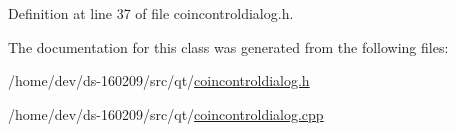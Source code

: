 Definition at line 37 of file coincontroldialog.\+h.



The documentation for this class was generated from the following files\+:\begin{DoxyCompactItemize}
\item 
/home/dev/ds-\/160209/src/qt/\hyperlink{coincontroldialog_8h}{coincontroldialog.\+h}\item 
/home/dev/ds-\/160209/src/qt/\hyperlink{coincontroldialog_8cpp}{coincontroldialog.\+cpp}\end{DoxyCompactItemize}
